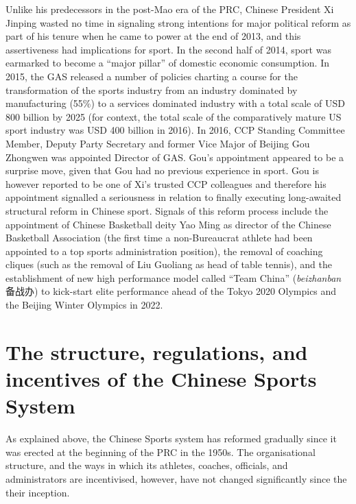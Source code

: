 {Unlike his predecessors in the post-Mao era of the PRC, Chinese President Xi Jinping wasted no time in signaling strong intentions for major political reform as part of his tenure when he came to power at the end of 2013, and this assertiveness had implications for sport.  In the second half of 2014, sport was earmarked to become a ``major pillar'' of domestic economic consumption. In 2015, the GAS released a number of policies charting a course for the transformation of the sports industry from an industry dominated by manufacturing (55\%) to a services dominated industry with a total scale of USD 800 billion by 2025 (for context, the total scale of the comparatively mature US sport industry was USD 400 billion in 2016).  In 2016, CCP Standing Committee Member, Deputy Party Secretary and former Vice Major of Beijing Gou Zhongwen was appointed Director of GAS.  Gou's appointment appeared to be a surprise move, given that Gou had no previous experience in sport. Gou is however reported to be one of Xi's trusted CCP colleagues and therefore his appointment signalled a seriousness in relation to finally executing long-awaited structural reform in Chinese sport.  Signals of this reform process include the appointment of Chinese Basketball deity Yao Ming as director of the Chinese Basketball Association (the first time a non-Bureaucrat athlete had been appointed to a top sports administration position), the removal of coaching cliques (such as the removal of Liu Guoliang as head of table tennis), and the establishment of new high performance model called ``Team China'' (\textit{beizhanban} 备战办) to kick-start elite performance ahead of the Tokyo 2020 Olympics and the Beijing Winter Olympics in 2022.





\section{The structure, regulations, and incentives of the Chinese Sports System}

As explained above, the Chinese Sports system has reformed gradually since it was erected at the beginning of the PRC in the 1950s. The organisational structure, and the ways in which its athletes, coaches, officials, and administrators are incentivised, however, have not changed significantly since the their inception.

}
